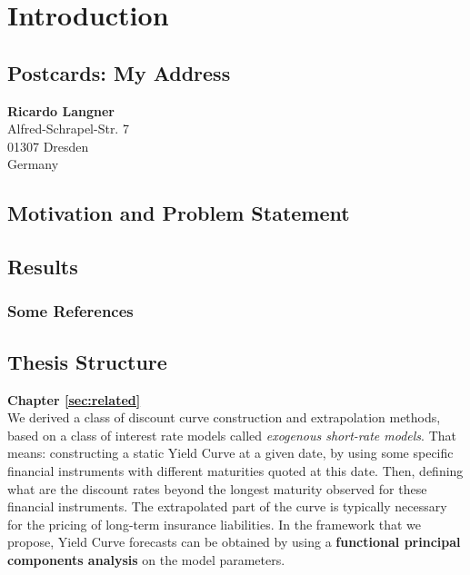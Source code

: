 %
\chapter{Introduction}
\label{sec:intro}


\Blindtext[2][2]

\section{Postcards: My Address}
\label{sec:intro:address}

\textbf{Ricardo Langner} \\
Alfred-Schrapel-Str. 7 \\
01307 Dresden \\
Germany


\section{Motivation and Problem Statement}
\label{sec:intro:motivation}

\Blindtext[3][1] \cite{Jurgens:2000,Jurgens:1995,Miede:2011,Kohm:2011,Apple:keynote:2010,Apple:numbers:2010,Apple:pages:2010}

\section{Results}
\label{sec:intro:results}

\Blindtext[1][2]

\subsection{Some References}
\label{sec:intro:results:refs}
\cite{WEB:GNU:GPL:2010,WEB:Miede:2011}

\section{Thesis Structure}
\label{sec:intro:structure}

\textbf{Chapter \ref{sec:related}} \\[0.2em]
We derived a class of discount curve construction and extrapolation methods,  based on a class of interest rate models called \textit{exogenous short-rate models}. That means: constructing a static Yield Curve at a given date, by using some specific financial instruments with different maturities quoted at this date. Then, defining what are the discount rates beyond the longest maturity observed for these financial instruments. The extrapolated part of the curve is typically necessary for the pricing of long-term insurance liabilities. In the framework that we propose, Yield Curve forecasts can be obtained by using a \textbf{functional principal components analysis} on the model parameters.

